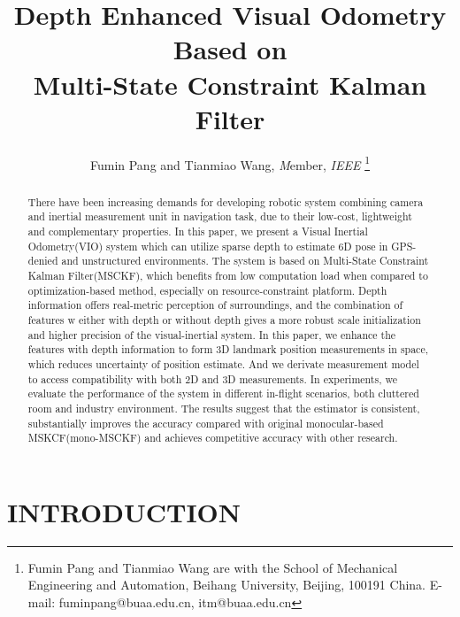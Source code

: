 \documentclass[a4paper, 10pt, conference]{ieeeconf}      %
\title{\LARGE \bf
Depth Enhanced Visual Odometry Based on \\ 
 Multi-State Constraint Kalman Filter
}
\author{Fumin Pang and Tianmiao Wang, \emph Member, \emph {IEEE}%
\thanks{Fumin Pang and Tianmiao Wang are with the School of Mechanical Engineering and
	Automation, Beihang University, Beijing, 100191 China.
        {E-mail: fuminpang@buaa.edu.cn, itm@buaa.edu.cn}}%
}
\begin{document}
\maketitle
\thispagestyle{empty}
\pagestyle{empty}


\begin{abstract}

There have been increasing demands for developing robotic system combining camera and inertial measurement unit in navigation task, due to their low-cost, lightweight and complementary properties. In this paper, we present a Visual Inertial Odometry(VIO) system which can utilize sparse depth to estimate 6D pose in GPS-denied and unstructured environments. The system is based on Multi-State Constraint Kalman Filter(MSCKF), which benefits from low computation load when compared to optimization-based method, especially on resource-constraint platform. Depth information offers real-metric perception of surroundings, and the combination of features w either with depth or  without depth gives a  more robust scale initialization and  higher  precision of the visual-inertial system. In this paper, we enhance the features with depth information to form  3D landmark position measurements in space, which reduces uncertainty  of position estimate. And we derivate measurement model to access compatibility with both 2D and 3D measurements.  In experiments, we  evaluate the performance of the system in different in-flight scenarios, both  cluttered room and  industry environment. The results suggest that the estimator is consistent, substantially improves the accuracy compared with original monocular-based MSKCF(mono-MSCKF) and achieves competitive accuracy with other research.




\end{abstract}


\section{INTRODUCTION}
\end{document}
